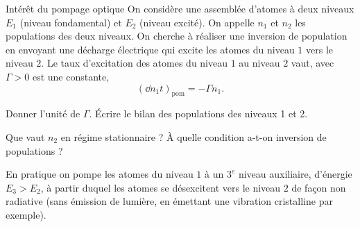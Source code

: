 \documentclass[12pt,fancy]{cours}
\begin{document}
\begin{exemple}{Intérêt du pompage optique}
  On considère une assemblée d’atomes à deux niveaux $E_1$ (niveau fondamental) et $E_2$ (niveau excité). On appelle $n_1$ et $n_2$ les populations des deux niveaux. On cherche à réaliser une inversion de population en envoyant une décharge électrique qui excite les atomes du niveau $1$ vers le niveau $2$. Le taux d’excitation des atomes du niveau $1$ au niveau $2$ vaut, avec $\Gamma >0$ est une constante,
  \begin{equation}
    \left( \dd{n_1}{t} \right)_\mathrm{pom} = -\Gamma n_1.
  \end{equation}
  
  \begin{quest}
    \item	Donner l’unité de $\Gamma$. Écrire le bilan des populations des niveaux 1 et 2.
    \item Que vaut $n_2$ en régime stationnaire ? À quelle condition a-t-on inversion de populations ?
  \end{quest}
\end{exemple}



\begin{remarque}
  En pratique on pompe les atomes du niveau $1$ à un $3^e$ niveau auxiliaire, d’énergie $E_3 > E_2$, à partir duquel les atomes se désexcitent vers le niveau $2$ de façon non radiative (sans émission de lumière, en émettant une vibration cristalline par exemple).

\end{remarque}

\end{document}
